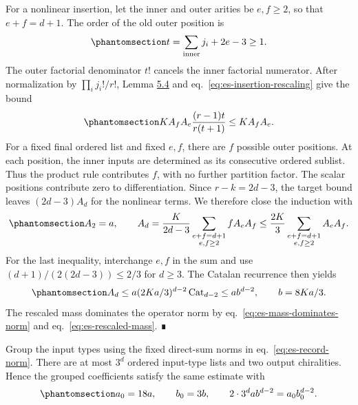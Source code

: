 \documentclass[
  english,
  11pt,
  reqno]{amsart}
\begin{document}
For a nonlinear insertion, let the inner and outer arities be
\(e,f\ge2\), so that \(e+f=d+1\). The order of the old outer position is
\begin{equation}\protect\phantomsection\label{eq:es-inserted-order}{
 t=\sum_{\mathrm{inner}}j_i+2e-3\ge1.
}\end{equation} The outer factorial denominator \(t!\) cancels the inner
factorial numerator. After normalization by \(\prod_i j_i!/r!\), Lemma
\hyperref[lem:es-transfer]{5.4} and eq.~\ref{eq:es-insertion-rescaling}
give the bound
\begin{equation}\protect\phantomsection\label{eq:es-normalized-insertion}{
 K A_fA_e\frac{(r-1)t}{r(t+1)}\le K A_fA_e.
}\end{equation} For a fixed final ordered list and fixed \(e,f\), there
are \(f\) possible outer positions. At each position, the inner inputs
are determined as its consecutive ordered sublist. Thus the product rule
contributes \(f\), with no further partition factor. The scalar
positions contribute zero to differentiation. Since \(r-k=2d-3\), the
target bound leaves \((2d-3)A_d\) for the nonlinear terms. We therefore
close the induction with
\begin{equation}\protect\phantomsection\label{eq:es-arity-recursion}{
 A_2=a,\qquad
 A_d=\frac K{2d-3}
       \sum_{\substack{e+f=d+1\\e,f\ge2}}fA_eA_f
 \le\frac{2K}{3}
       \sum_{\substack{e+f=d+1\\e,f\ge2}}A_eA_f.
}\end{equation} For the last inequality, interchange \(e,f\) in the sum
and use \((d+1)/(2(2d-3))\le2/3\) for \(d\ge3\). The Catalan recurrence
then yields
\begin{equation}\protect\phantomsection\label{eq:es-catalan-bound}{
 A_d\le a(2Ka/3)^{d-2}\operatorname{Cat}_{d-2}
       \le ab^{d-2},\qquad b=8Ka/3.
}\end{equation} The rescaled mass dominates the operator norm by
eq.~\ref{eq:es-mass-dominates-norm} and eq.~\ref{eq:es-rescaled-mass}. ∎

Group the input types using the fixed direct-sum norms in
eq.~\ref{eq:es-record-norm}. There are at most \(3^d\) ordered
input-type lists and two output chiralities. Hence the grouped
coefficients satisfy the same estimate with
\begin{equation}\protect\phantomsection\label{eq:es-grouped-constants}{
 a_0=18a,\qquad b_0=3b,
 \qquad 2\cdot3^dab^{d-2}=a_0b_0^{d-2}.
}\end{equation}
\end{document}
